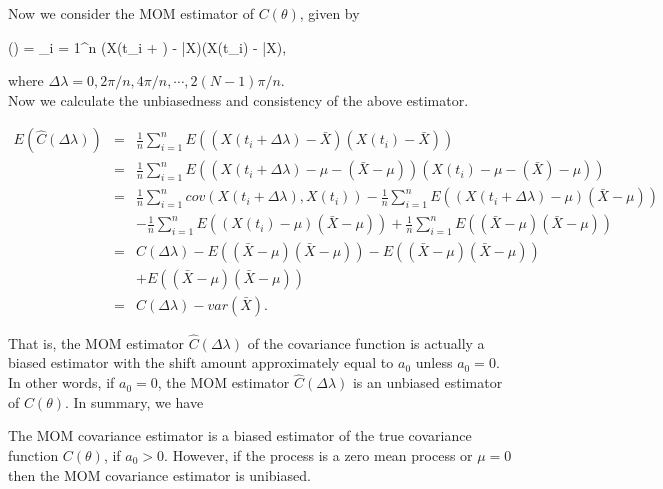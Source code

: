 \vskip 8pt

Now we consider the MOM estimator of $C(\theta)$, given by

\beq \label{covarince_estimator}
(\Delta \lambda) = \sum_{i = 1}^n (X(t_i + \Delta \lambda) - \bar{X})(X(t_i) - \bar{X}), 
\eeq

where $\Delta \lambda = 0, 2\pi/n, 4\pi/n, \cdots, 2(N-1)\pi/n$.\\

Now we calculate the unbiasedness and consistency of the above estimator.

\begin{eqnarray*}
	E(\hat{C}(\Delta \lambda)) &=& \frac{1}{n}\sum_{i = 1}^n E((X(t_i + \Delta \lambda) - \bar{X})(X(t_i) - \bar{X})) \\ 
	&=& \frac{1}{n}\sum_{i = 1}^n E((X(t_i + \Delta \lambda) - \mu - (\bar{X} - \mu))(X(t_i) -\mu - (\bar{X}) - \mu)) \\ 
	&=& \frac{1}{n}\sum_{i=1}^n cov(X(t_i+\Delta \lambda), X(t_i)) - \frac{1}{n}\sum_{i = 1}^n E((X(t_i + \Delta \lambda) - \mu)(\bar{X} - \mu)) \\ 
	& & -\frac{1}{n}\sum_{i = 1}^n E((X(t_i) - \mu)(\bar{X} - \mu)) + \frac{1}{n}\sum_{i = 1}^n E((\bar{X} - \mu)(\bar{X} - \mu)) \\ 
	&=& C(\Delta \lambda) -E((\bar{X} - \mu)(\bar{X} - \mu)) - E((\bar{X} - \mu)(\bar{X} - \mu)) \\  
	& & + E((\bar{X} - \mu)(\bar{X} - \mu)) \\ 
	&=& C(\Delta \lambda) - var(\bar{X}).
\end{eqnarray*}

That is, the MOM estimator $\hat{C}(\Delta \lambda)$ of the covariance function is actually a biased estimator with the shift amount approximately equal to $a_0$ unless $a_0 = 0$. In other words, if $a_0 = 0$, the MOM estimator $\hat{C}(\Delta \lambda)$ is an unbiased estimator of $C(\theta)$. In summary, we have \\

\begin{prop} \label{prop3.2}
The MOM covariance estimator is a biased estimator of the true covariance function $C(\theta)$, if $a_0 > 0$. However, if the process is a zero mean process or $\mu = 0$ then the MOM covariance estimator is unibiased.\\
\end{prop}

